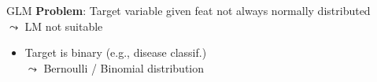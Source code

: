 \documentclass[10pt,compress,t,notes=noshow, xcolor=table]{beamer}
\date{}
\begin{document}

\begin{frame}{GLM }
\vspace{-0.2cm}
\textbf{Problem}: Target variable given feat not always normally distributed \\$\leadsto$ LM not suitable

\begin{itemize}
    \item Target is binary (e.g., disease classif.)\\
    $\leadsto$ Bernoulli / Binomial distribution
\end{itemize}
\begin{splitVCC}[0.5]{

}
\end{splitVCC}
\end{frame}
\end{document}
